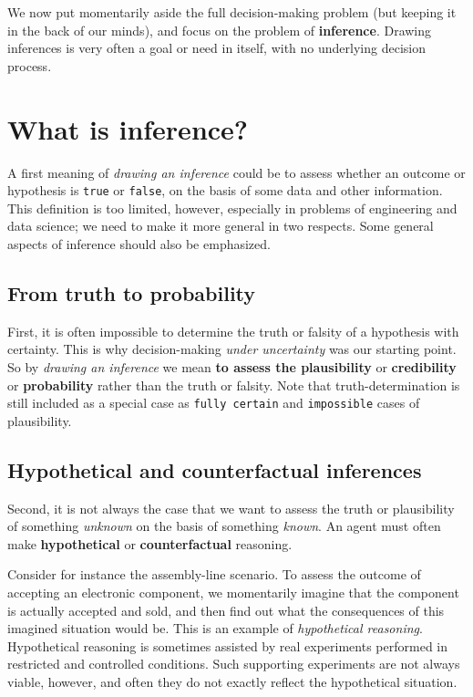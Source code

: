 \documentclass[
  a4paper,
  DIV=11,
  numbers=noendperiod,
  oneside]{scrreprt}
\begin{document}
We now put momentarily aside the full decision-making problem (but
keeping it in the back of our minds), and focus on the problem of
{\textbf{inference}}. Drawing inferences is very often a goal or need in
itself, with no underlying decision process.

\hypertarget{what-is-inference}{%
\section{What is inference?}\label{what-is-inference}}

A first meaning of \emph{drawing an inference} could be to assess
whether an outcome or hypothesis is \texttt{true} or \texttt{false}, on
the basis of some data and other information. This definition is too
limited, however, especially in problems of engineering and data
science; we need to make it more general in two respects. Some general
aspects of inference should also be emphasized.

\hypertarget{from-truth-to-probability}{%
\subsection{From truth to probability}\label{from-truth-to-probability}}

First, it is often impossible to determine the truth or falsity of a
hypothesis with certainty. This is why decision-making \emph{under
uncertainty} was our starting point. So by \emph{drawing an inference}
we mean {\textbf{to assess the plausibility}} or {\textbf{credibility}}
or {\textbf{probability}} rather than the truth or falsity. Note that
truth-determination is still included as a special case as
\texttt{fully\ certain} and \texttt{impossible} cases of plausibility.

\hypertarget{hypothetical-and-counterfactual-inferences}{%
\subsection{Hypothetical and counterfactual
inferences}\label{hypothetical-and-counterfactual-inferences}}

Second, it is not always the case that we want to assess the truth or
plausibility of something \emph{unknown} on the basis of something
\emph{known}. An agent must often make \textbf{hypothetical} or
\textbf{counterfactual} reasoning.

Consider for instance the assembly-line scenario. To assess the outcome
of accepting an electronic component, we momentarily imagine that the
component is actually accepted and sold, and then find out what the
consequences of this imagined situation would be. This is an example of
\emph{hypothetical reasoning}. Hypothetical reasoning is sometimes
assisted by real experiments performed in restricted and controlled
conditions. Such supporting experiments are not always viable, however,
and often they do not exactly reflect the hypothetical situation.
\end{document}
